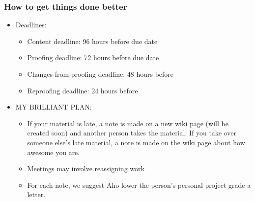 \subsubsection*{How to get things done better}
\begin{itemize}
\item Deadlines:
  \begin{itemize}
  \item Content deadline: 96 hours before due date
  \item Proofing deadline: 72 hours before due date
  \item Changes-from-proofing deadline: 48 hours before
  \item Reproofing deadline: 24 hours before
  \end{itemize}
\item MY BRILLIANT PLAN:
  \begin{itemize}
  \item If your material is late, a note is made on a new wiki page
    (will be created soon) and another person takes the material. If
    you take over someone else's late material, a note is made on the
    wiki page about how awesome you are.
  \item Meetings may involve reassigning work
  \item For each note, we suggest Aho lower the person's personal
    project grade a letter.
  \end{itemize}
\end{itemize}

